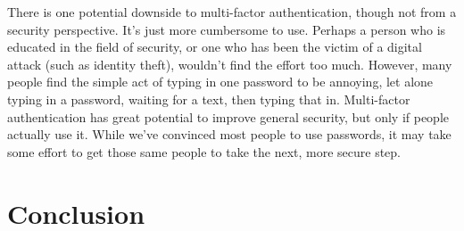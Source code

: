 \documentclass[12pt]{apa6}
\begin{document}
There is one potential downside to multi-factor authentication, though not from a security perspective. It's just more cumbersome to use. Perhaps a person who is educated in the field of security, or one who has been the victim of a digital attack (such as identity theft), wouldn't find the effort too much. However, many people find the simple act of typing in one password to be annoying, let alone typing in a password, waiting for a text, then typing that in. Multi-factor authentication has great potential to improve general security, but only if people actually use it. While we've convinced most people to use passwords, it may take some effort to get those same people to take the next, more secure step.

\section{Conclusion}

\printbibliography
\end{document}
